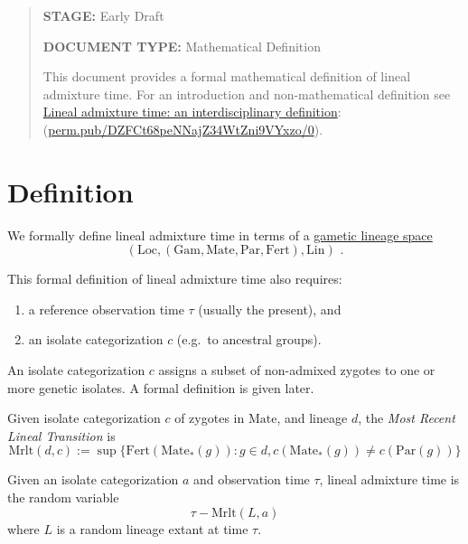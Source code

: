 \documentclass{article}
\begin{document}
\newcommand{\dom}[1]{\operatorname{dom}{ #1}}
\newcommand{\mathstop}{\text{ .}}

\newcommand{\Gam}{\mathrm{Gam}}
\newcommand{\Loc}{\mathrm{Loc}}
\newcommand{\Lin}{\mathrm{Lin}}
\newcommand{\Mate}{\mathrm{Mate}}
\newcommand{\Par}{\mathrm{Par}}
\newcommand{\Fert}{\mathrm{Fert}}
\newcommand{\Mrlt}{\mathrm{Mrlt}}


\begin{abstract}
\textbf{STAGE:} Early Draft

\textbf{DOCUMENT TYPE:} Mathematical Definition

This document provides a formal mathematical definition of lineal
admixture time. For an introduction and non-mathematical definition see
\href{https://perm.pub/DZFCt68peNNajZ34WtZni9VYxzo/0}{Lineal admixture time: an interdisciplinary definition}:
\\ (\href{https://perm.pub/DZFCt68peNNajZ34WtZni9VYxzo/0}{perm.pub/DZFCt68peNNajZ34WtZni9VYxzo/0}).
\end{abstract}


\section{Definition}

We formally define lineal admixture time in terms of a
\href{https://popgen.es/0iV47kWzQAuyONrIDG538k3x3Qc/0.3/}{gametic
lineage space}
\cite{dsi:0i/0.3}
\[
(\Loc, (\Gam, \Mate, \Par, \Fert), \Lin)
\mathstop
\]

This formal definition of lineal admixture time also requires:

\begin{enumerate}
\item
  a reference observation time \(\tau\) (usually the present), and
\item
  an isolate categorization \(c\) (e.g.~to ancestral groups).
\end{enumerate}

An isolate categorization \(c\) assigns a subset of non-admixed zygotes
to one or more genetic isolates. A formal definition is given later.

Given isolate categorization \(c\) of zygotes in \(\Mate\), and lineage
\(d\), the \emph{Most Recent Lineal Transition} is \[
\Mrlt(d,c) := \sup\{ \Fert(\Mate_*(g)) : g \in d, c(\Mate_*(g)) \not= c(\Par(g)) \}
\]

Given an isolate categorization \(a\) and observation time \(\tau\),
lineal admixture time is the random variable \[
\tau - \Mrlt(L, a)
\] where \(L\) is a random lineage extant at time \(\tau\).
\end{document}
